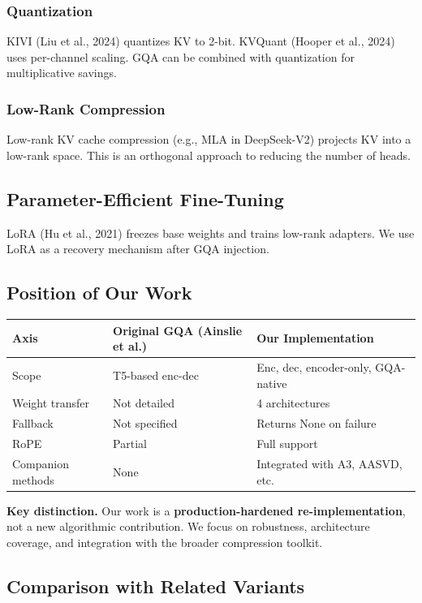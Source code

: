 \subsubsection{Quantization}

KIVI (Liu et al., 2024) quantizes KV to 2-bit. KVQuant (Hooper et al., 2024) 
uses per-channel scaling. GQA can be combined with quantization for 
multiplicative savings.

\subsubsection{Low-Rank Compression}

Low-rank KV cache compression (e.g., MLA in DeepSeek-V2) projects KV into 
a low-rank space. This is an orthogonal approach to reducing the number of 
heads.

\subsection{Parameter-Efficient Fine-Tuning}

LoRA (Hu et al., 2021) freezes base weights and trains low-rank adapters. 
We use LoRA as a recovery mechanism after GQA injection.

\subsection{Position of Our Work}

\begin{table}[H]
\centering
\small
\begin{tabular}{lll}
\toprule
\textbf{Axis} & \textbf{Original GQA (Ainslie et al.)} & \textbf{Our Implementation} \\
\midrule
Scope & T5-based enc-dec & Enc, dec, encoder-only, GQA-native \\
Weight transfer & Not detailed & 4 architectures \\
Fallback & Not specified & Returns None on failure \\
RoPE & Partial & Full support \\
Companion methods & None & Integrated with A3, AASVD, etc. \\
\bottomrule
\end{tabular}
\end{table}

\textbf{Key distinction.} Our work is a \textbf{production-hardened re-implementation}, 
not a new algorithmic contribution. We focus on robustness, architecture 
coverage, and integration with the broader compression toolkit.

\subsection{Comparison with Related Variants}
